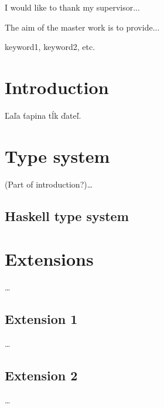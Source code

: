 \documentclass[11pt,oneside,draft]{fithesis2}
\begin{document}
\FrontMatter
\ThesisTitlePage

\begin{ThesisDeclaration}
\DeclarationText
\AdvisorName
\end{ThesisDeclaration}

\begin{ThesisThanks}
I would like to thank my supervisor...
\end{ThesisThanks}

\begin{ThesisAbstract}
The aim of the master work is to provide...
\end{ThesisAbstract}

\begin{ThesisKeyWords}
keyword1, keyword2, etc.
\end{ThesisKeyWords}

\tableofcontents

\MainMatter

\chapter{Introduction}
Ľaľa ťapina tĺk ďateľ.

\chapter{Type system}

(Part of introduction?)\dots

\section{Haskell type system}

\cite{haskell.org}

\chapter{Extensions}

\dots

\section{Extension 1}

\dots

\section{Extension 2}

\dots
\end{document}
